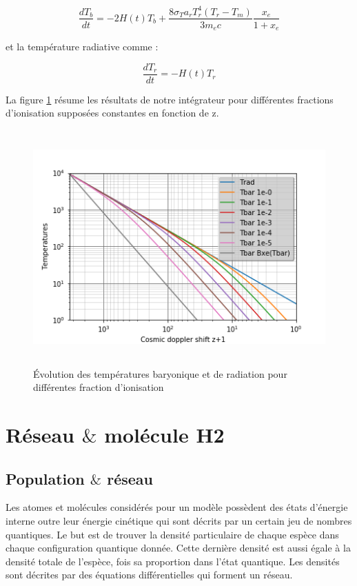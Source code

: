 \documentclass[10pt, a4paper]{report}
\numberwithin{equation}{subsection}
\begin{document}
\begin{equation} \label{eq:EERT}
\boxed{\frac{dT_b}{dt} = -2H(t)T_b+\frac{8\sigma_Ta_rT_r^4(T_r-T_m)}{3m_ec}\frac{x_e}{1+x_e}}
\end{equation}

et la température radiative comme :

\begin{equation} \label{eq:EERR}
\boxed{\frac{dT_r}{dt} = -H(t)T_r}
\end{equation}

La figure \ref{fig:T} résume les résultats de notre intégrateur pour différentes fractions d’ionisation supposées constantes en fonction de z.

\begin{figure}[]
\centering
\includegraphics[width=12.0cm,height=9cm]{Temperatures.png}
\caption{\uppercase{é}volution des températures baryonique et de radiation pour différentes fraction d'ionisation}
\label{fig:T}
\end{figure}

\section{Réseau $\&$ molécule H2}
\subsection{Population $\&$ réseau}
Les atomes et molécules considérés pour un modèle possèdent des états d'énergie interne outre leur énergie cinétique qui sont décrits par un certain jeu de nombres quantiques. Le but est de trouver la densité particulaire de chaque espèce dans chaque configuration quantique donnée. Cette dernière densité est aussi égale à la densité totale de l'espèce, fois sa proportion dans l'état quantique. Les densités sont décrites par des équations différentielles qui forment un réseau.\bigskip
\large
\end{document}
